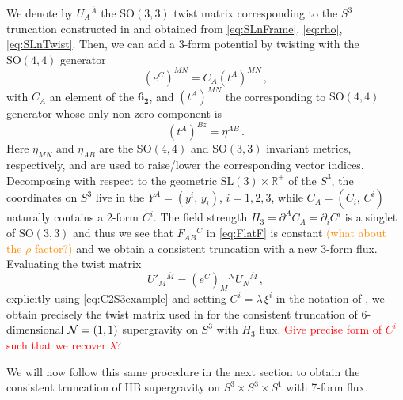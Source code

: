 \documentclass[a4paper, 11pt]{article}
\numberwithin{equation}{section}
\newcommand{\ov}[1]{\overline{#1}}
\newcommand{\SL}[1]{\mathrm{SL}( #1 )}
\newcommand{\SO}[1]{\mathrm{SO}( #1 )}
\newcommand{\+}{\oplus}
\newcommand{\EM}[1]{\textcolor{red}{#1}}
\newcommand{\CE}[1]{\textcolor{darkorange}{#1}}
\begin{document}
We denote by $U_A{}^{\ov{A}}$ the $\SO{3,3}$ twist matrix corresponding to the $S^3$ truncation constructed in \cite{Lee:2014mla,Baguet:2015iou} and obtained from \eqref{eq:SLnFrame}, \eqref{eq:rho}, \eqref{eq:SLnTwist}. Then, we can add a 3-form potential by twisting with the $\SO{4,4}$ generator
\begin{equation} \label{eq:C2S3example}
	(e^C)^{MN} = C_A \left( t^A \right)^{MN} \,,
\end{equation}
with $C_A$ an element of the $\mathbf{6_{2}}$, and $\left( t^A \right)^{MN}$ the corresponding to $\SO{4,4}$ generator whose only non-zero component is
\begin{equation}
	\left(t^A\right)^{Bz} = \eta^{AB} \,.
\end{equation}
Here $\eta_{MN}$ and $\eta_{AB}$ are the $\SO{4,4}$ and $\SO{3,3}$ invariant metrics, respectively, and are used to raise/lower the corresponding vector indices. Decomposing with respect to the geometric $\SL{3} \times \mathbb{R}^+$ of the $S^3$,  the coordinates on $S^3$ live in the $Y^A = \left( y^i,\, y_i \right)$, $i = 1, 2, 3$, while $C_A = \left( C_i,\, C^i \right)$ naturally contains a 2-form $C^i$. The field strength $H_3 = \partial^A C_A = \partial_i C^i$ is a singlet of $\SO{3,3}$ and thus we see that $F_{AB}{}^C$ in \eqref{eq:FlatF} is constant \CE{(what about the $\rho$ factor?)} and we obtain a consistent truncation with a new 3-form flux. Evaluating the twist matrix
\begin{equation}
	U'_M{}^{\ov{M}} = (e^C)_M{}^N  U_N{}^{\ov{M}} \,,
\end{equation}
explicitly using \eqref{eq:C2S3example} and setting $C^i = \lambda\, \xi^i$ in the notation of \cite{Eloy:2021fhc}, we obtain precisely the twist matrix used in \cite{Eloy:2021fhc} for the consistent truncation of 6-dimensional ${\cal N}=(1,1)$ supergravity on $S^3$ with $H_3$ flux. \EM{Give precise form of $C^i$ such that we recover $\lambda$?}

We will now follow this same procedure in the next section to obtain the consistent truncation of IIB supergravity on $S^3 \times S^3 \times S^1$ with 7-form flux.
\end{document}
